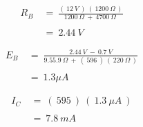 {\bfseries\itshape{}} 

\begin{flushright}
{\bfseries\itshape{}} \hfill \break
\end{flushright}

\begin{ceqn}
\begin{align}
R_{B}\ &=\ \frac{(\ 12\ V\ )\ (\ 1200\ \Omega\ )}{1200\ \Omega\ +\ 4700\ \Omega\ } \\ \\
&=\ 2.44\ V
\end{align}
\end{ceqn} \hfill \break

{\bfseries\itshape{}} 

\begin{flushright}
{\bfseries\itshape{}} \hfill \break
\end{flushright}

\begin{ceqn}
\begin{align}
E_{B}\ &=\ \frac{2.44\ V\ -\ 0.7\ V}{9.55.9\ \Omega\ +\ (\ 596\ )\ (\ 220\ \Omega\ )} \\ \\
&=\ 1.3 \mu A
\end{align}
\end{ceqn} 

{\bfseries\itshape{}} 

\begin{flushright}
{\bfseries\itshape{}} \hfill \break
\end{flushright}

\begin{ceqn}
\begin{align}
I_{C}\ &=\ (\ 595\ )\ (\ 1.3\ \mu A\ ) \\ \\
&=\ 7.8\ mA
\end{align}
\end{ceqn} \hfill \break

